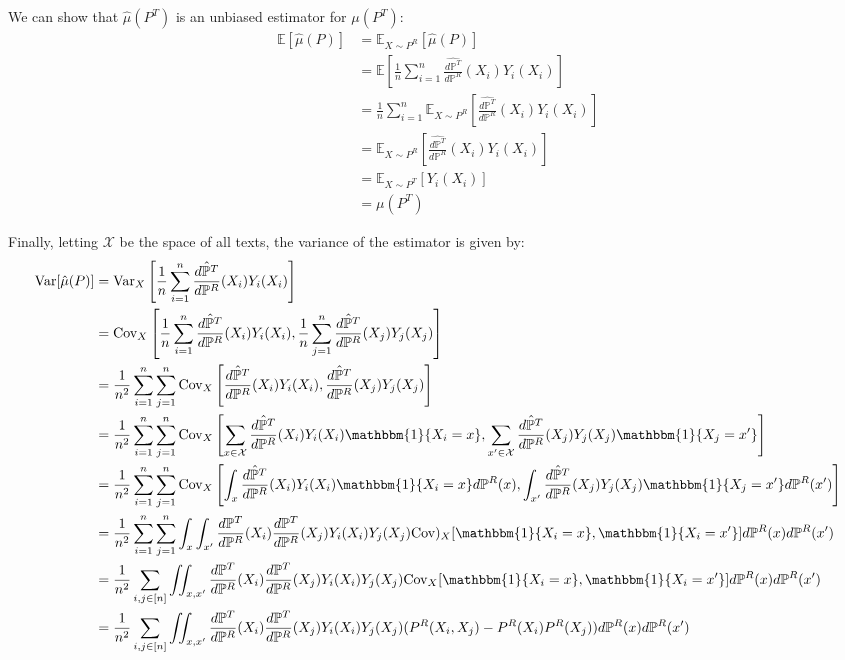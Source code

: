 \documentclass{article}
\begin{document}
	We can show that $\hat{\mu}(P^T)$ is an unbiased estimator for $\mu(P^T)$:
	\begin{align*}
		\mathbb{E}[\hat{\mu}(P)] &= \mathbb{E}_{X \sim P^R}[\hat{\mu}(P)] \\
		&= \mathbb{E}\left[\frac{1}{n} \sum_{i=1}^n \frac{\hat{d \mathbb{P}^T}}{d \mathbb{P}^R}(X_i)Y_i(X_i)\right] \\
		&=\frac{1}{n}\sum_{i=1}^n \mathbb{E}_{X \sim P^R}\left[\frac{\hat{d \mathbb{P}^T}}{d \mathbb{P}^R}(X_i)Y_i(X_i)\right] \\
		&= \mathbb{E}_{X \sim P^R}\left[\frac{\hat{d \mathbb{P}^T}}{d \mathbb{P}^R}(X_i)Y_i(X_i)\right] \\
		&=\mathbb{E}_{X \sim P^T}[Y_i(X_i)] \\
		&= \mu(P^T)
	\end{align*}
	
	Finally, letting $\mathcal{X}$ be the space of all texts, the variance of the estimator is given by:
	\begin{align*}
		\text{Var}[\hat{\mu}(P)] &= \text{Var}_X\left[\frac{1}{n} \sum_{i=1}^n \frac{\hat{d \mathbb{P}^T}}{d \mathbb{P}^R}(X_i)Y_i(X_i)\right] \\
		&= \text{Cov}_X\left[\frac{1}{n} \sum_{i=1}^n \frac{\hat{d \mathbb{P}^T}}{d \mathbb{P}^R}(X_i)Y_i(X_i), \frac{1}{n} \sum_{j=1}^n \frac{\hat{d \mathbb{P}^T}}{d \mathbb{P}^R}(X_j)Y_j(X_j)\right] \\
		&= \frac{1}{n^2}\sum_{i=1}^n \sum_{j=1}^n \text{Cov}_X\left[\frac{\hat{d \mathbb{P}^T}}{d \mathbb{P}^R}(X_i)Y_i(X_i), \frac{\hat{d \mathbb{P}^T}}{d \mathbb{P}^R}(X_j)Y_j(X_j)\right] \\
		&= \frac{1}{n^2}\sum_{i=1}^n \sum_{j=1}^n \text{Cov}_X\left[\sum_{x \in \mathcal{X}}\frac{\hat{d \mathbb{P}^T}}{d \mathbb{P}^R}(X_i)Y_i(X_i)\mathbbm{1}\{X_i = x\}, \sum_{x' \in \mathcal{X}}\frac{\hat{d \mathbb{P}^T}}{d \mathbb{P}^R}(X_j)Y_j(X_j)\mathbbm{1}\{X_j=x'\}\right] \\
		&= \frac{1}{n^2}\sum_{i=1}^n \sum_{j=1}^n \text{Cov}_X\left[\int_x\frac{\hat{d \mathbb{P}^T}}{d \mathbb{P}^R}(X_i)Y_i(X_i)\mathbbm{1}\{X_i = x\}d\mathbb{P}^R(x), \int_{x'}\frac{\hat{d \mathbb{P}^T}}{d \mathbb{P}^R}(X_j)Y_j(X_j)\mathbbm{1}\{X_j=x'\}d\mathbb{P}^R(x')\right] \\
		&= \frac{1}{n^2} \sum_{i=1}^n \sum_{j=1}^n \int_x \int_{x'} \frac{d \mathbb{P}^T}{d \mathbb{P}^R}(X_i)\frac{d \mathbb{P}^T}{d \mathbb{P}^R}(X_j)Y_i(X_i)Y_j(X_j) \text{Cov})_X[\mathbbm{1}\{X_i=x\}, \mathbbm{1}\{X_i=x'\}]d\mathbb{P}^R(x)d\mathbb{P}^R(x') \\
		&= \frac{1}{n^2} \sum_{i,j \in [n]} \iint_{x, x'} \frac{d \mathbb{P}^T}{d \mathbb{P}^R}(X_i)\frac{d \mathbb{P}^T}{d \mathbb{P}^R}(X_j)Y_i(X_i)Y_j(X_j) \text{Cov}_X[\mathbbm{1}\{X_i=x\}, \mathbbm{1}\{X_i=x'\}]d\mathbb{P}^R(x)d\mathbb{P}^R(x') \\
		&= \frac{1}{n^2} \sum_{i,j \in [n]} \iint_{x, x'} \frac{d \mathbb{P}^T}{d \mathbb{P}^R}(X_i)\frac{d \mathbb{P}^T}{d \mathbb{P}^R}(X_j)Y_i(X_i)Y_j(X_j) (P^R(X_i,X_j) - P^R(X_i)P^R(X_j))d\mathbb{P}^R(x)d\mathbb{P}^R(x')
	\end{align*}
	
\end{document}
